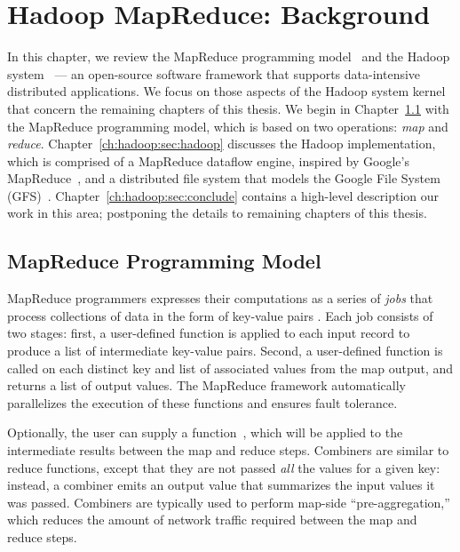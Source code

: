 \chapter[Hadoop MapReduce: Background]{Hadoop MapReduce: Background}
\label{ch:hadoop}

In this chapter, we review the MapReduce programming
model~\cite{mapreduce-osdi} and the Hadoop system~\cite{hadoop} --- an
open-source software framework that supports data-intensive distributed
applications.  We focus on those aspects of the Hadoop system kernel that
concern the remaining chapters of this thesis.  We begin in
Chapter~\ref{ch:hadoop:sec:progmodel} with the MapReduce programming model,
which is based on two operations: {\em map} and {\em reduce}.
Chapter~\ref{ch:hadoop:sec:hadoop} discusses the Hadoop implementation, which
is comprised of a MapReduce dataflow engine, inspired by Google's
MapReduce~\cite{mapreduce-osdi}, and a distributed file system that models the
Google File System (GFS)~\cite{gfs-sosp}.  Chapter~\ref{ch:hadoop:sec:conclude}
contains a high-level description our work in this area; postponing the details
to remaining chapters of this thesis.

\section{MapReduce Programming Model}
\label{ch:hadoop:sec:progmodel}

MapReduce programmers expresses their computations as a series of {\em jobs}
that process collections of data in the form of key-value pairs . Each job
consists of two stages: first, a user-defined  function is applied to
each input record to produce a list of intermediate key-value pairs.  Second, a
user-defined  function is called on each distinct key and
list of associated values from the map output, and returns a list of output
values.  The MapReduce framework automatically parallelizes the execution of
these functions and ensures fault tolerance.

Optionally, the user can supply a 
function~\cite{mapreduce-osdi}, which will be applied to the intermediate
results between the map and reduce steps.  Combiners are similar to reduce
functions, except that they are not passed {\em all} the values for a given
key: instead, a combiner emits an output value that summarizes the input values
it was passed.  Combiners are typically used to perform map-side
``pre-aggregation,'' which reduces the amount of network traffic required
between the map and reduce steps.

